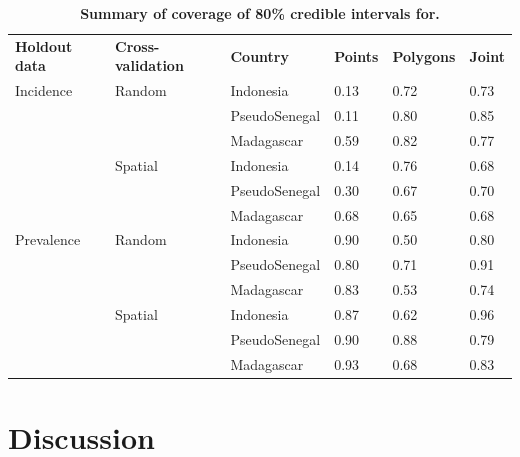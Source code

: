 \documentclass[10pt,letterpaper]{article}
\newlength\savedwidth
\newcommand\thickhline{\noalign{\global\savedwidth\arrayrulewidth\global\arrayrulewidth 2pt}%
\hline
\noalign{\global\arrayrulewidth\savedwidth}}
\begin{document}
\begin{table}[!t]
\begin{adjustwidth}{-2.25in}{0in} %
\centering
\caption{
{\bf Summary of coverage of 80\% credible intervals for.}}
\begin{tabular}{llllll}
\hline
{\bf Holdout data} & {\bf Cross-validation} & {\bf Country} &  {\bf Points} & {\bf Polygons} & {\bf Joint} \\
\thickhline 
Incidence & Random & Indonesia & 0.13 & 0.72 &  0.73\\
&& PseudoSenegal & 0.11 & 0.80 &  0.85\\
&& Madagascar & 0.59 & 0.82 &  0.77\vspace{1mm}\\
& Spatial & Indonesia & 0.14 & 0.76 &  0.68\\
&& PseudoSenegal & 0.30 & 0.67 &  0.70\\
&& Madagascar & 0.68 & 0.65 &  0.68\vspace{3mm} \\
Prevalence & Random & Indonesia & 0.90 & 0.50 &  0.80\\
&& PseudoSenegal & 0.80 & 0.71 &  0.91\\
&& Madagascar & 0.83 & 0.53 &  0.74\vspace{1mm}\\
& Spatial & Indonesia & 0.87 & 0.62 &  0.96\\
&& PseudoSenegal & 0.90 & 0.88 &  0.79\\
&& Madagascar & 0.93 & 0.68 &  0.83\\
\end{tabular}
\begin{flushleft}

\end{flushleft}
\label{table3}
\end{adjustwidth}
\end{table}




\section*{Discussion}


\end{document}
